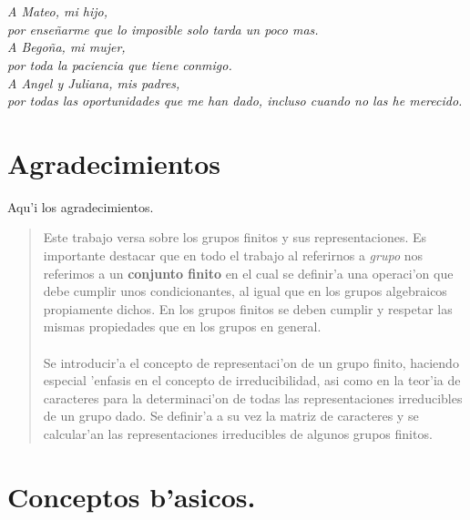 \documentclass[a4paper,openright,12pt]{report}
\numberwithin{equation}{section} %
\begin{document}
\chapter*{}
\begin{flushright}
\textit{A Mateo, mi hijo, \\
por ense\~narme que lo imposible solo tarda un poco mas.\\
A Bego\~na, mi mujer, \\
por toda la paciencia que tiene conmigo.\\
A Angel y Juliana, mis padres, \\
por todas las oportunidades que me han dado, incluso cuando no las he merecido.}
\end{flushright}
\chapter*{Agradecimientos} 
Aqu'i los agradecimientos.
\begin{abstract}
Este trabajo versa sobre los grupos finitos y sus representaciones. Es importante destacar que en todo el trabajo al referirnos a \textit{grupo} nos referimos a un  \textbf{conjunto finito} en el cual se definir'a una operaci'on que debe cumplir unos condicionantes, al igual que en los grupos algebraicos propiamente dichos. En los grupos finitos se deben cumplir y respetar las mismas propiedades que en los grupos en general.\\
\\
Se introducir'a el concepto de representaci'on de un grupo finito, haciendo especial 'enfasis en el concepto de irreducibilidad, asi como en la teor'ia de caracteres para la determinaci'on de todas las representaciones irreducibles de un grupo dado. Se definir'a a su vez la matriz de caracteres y se calcular'an las representaciones irreducibles de algunos grupos finitos. 
\end{abstract}
\tableofcontents
\chapter{Conceptos b'asicos.}
\end{document}
